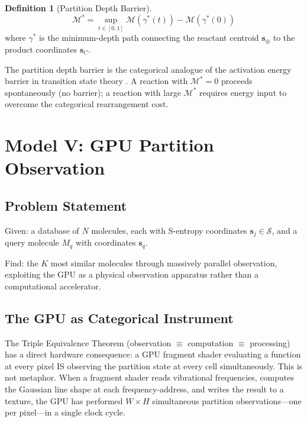 \documentclass[11pt,twocolumn,a4paper]{article}
\theoremstyle{definition}
\newtheorem{definition}[theorem]{Definition}
\theoremstyle{remark}
\newcommand{\Sspace}{\mathcal{S}}
\newcommand{\Depth}{\mathcal{M}}
\begin{document}
\begin{definition}[Partition Depth Barrier]
\label{def:barrier}
\begin{equation}
\Depth^* = \sup_{t \in [0,1]} \Depth(\gamma^*(t)) - \Depth(\gamma^*(0))
\label{eq:barrier}
\end{equation}
where $\gamma^*$ is the minimum-depth path connecting the reactant centroid $\mathbf{s}_{\oplus}$ to the product coordinates $\mathbf{s}_C$.
\end{definition}

The partition depth barrier is the categorical analogue of the activation energy barrier in transition state theory \citep{eyring1935}. A reaction with $\Depth^* = 0$ proceeds spontaneously (no barrier); a reaction with large $\Depth^*$ requires energy input to overcome the categorical rearrangement cost.


\section{Model V: GPU Partition Observation}
\label{sec:model5}

\subsection{Problem Statement}

Given: a database of $N$ molecules, each with S-entropy coordinates $\mathbf{s}_j \in \Sspace$, and a query molecule $M_q$ with coordinates $\mathbf{s}_q$.

Find: the $K$ most similar molecules through massively parallel observation, exploiting the GPU as a physical observation apparatus rather than a computational accelerator.

\subsection{The GPU as Categorical Instrument}

The Triple Equivalence Theorem (observation $\equiv$ computation $\equiv$ processing) has a direct hardware consequence: a GPU fragment shader evaluating a function at every pixel IS observing the partition state at every cell simultaneously. This is not metaphor. When a fragment shader reads vibrational frequencies, computes the Gaussian line shape at each frequency-address, and writes the result to a texture, the GPU has performed $W \times H$ simultaneous partition observations---one per pixel---in a single clock cycle.
\end{document}
